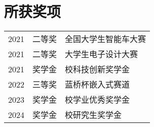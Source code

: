 \documentclass[]{deedy-resume-openfont}
\begin{document}
\begin{minipage}[t]{0.73\textwidth}

\section{所获奖项} 
\begin{tabular}{rll}
2021         & 二等奖  & 全国大学生智能车大赛 \\
2021	     & 二等奖  & 大学生电子设计大赛 \\
2021	     & 奖学金  & 校科技创新奖学金 \\
2022	     & 三等奖  & 蓝桥杯嵌入式赛道 \\
2023         & 奖学金  & 校学业优秀奖学金\\
2024	     & 奖学金  & 校研究生奖学金 \\
\end{tabular}
\sectionsep


% 
% 

\end{minipage} 
\end{document}
